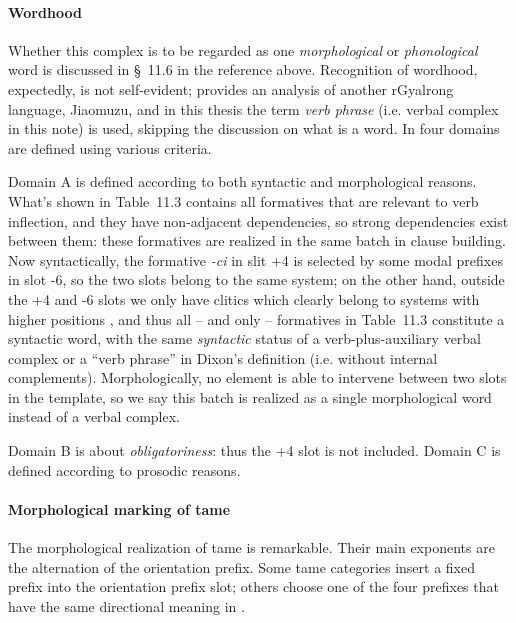 \documentclass[a4paper, oneside, 12pt]{report}
\newcommand*{\citesec}[1]{\S~{#1}}
\newcommand*{\citetable}[1]{Table~{#1}}
\newcommand*{\term}[1]{\emph{#1}}
\newcommand{\form}[1]{\emph{#1}}
\begin{document}
\paragraph*{Wordhood}
Whether this complex is to be regarded as one \emph{morphological} or \emph{phonological} word 
is discussed in \citesec{11.6}
in the reference above.
Recognition of wordhood, expectedly, is not self-evident;
\citet{prins2011web} provides an analysis of another rGyalrong language, Jiaomuzu, 
and in this thesis the term \term{verb phrase} 
(i.e. verbal complex in this note) is used,
skipping the discussion on what is a word.
In \citet[\citetable{11.3}]{jacques2021grammar}
four domains are defined using various criteria.

Domain A is defined according to both syntactic and morphological reasons.
What's shown in 
\citetable{11.3} contains all formatives that are relevant to verb inflection,
and they have non-adjacent dependencies,
so strong dependencies exist between them:
these formatives are realized in the same batch 
in clause building.
Now syntactically, the formative \form{-ci} in slit +4 
is selected by some modal prefixes in slot -6,
so the two slots belong to the same system;
on the other hand, outside the +4 and -6 slots 
we only have clitics which clearly belong to systems with higher positions
\citep[\citesec{11.6.2}]{jacques2021grammar},
and thus all -- and only -- formatives in \citetable{11.3}
constitute a syntactic word,
with the same \emph{syntactic} status of a verb-plus-auxiliary verbal complex or a
``verb phrase'' in Dixon's definition (i.e. without internal complements). 
Morphologically, no element is able to intervene 
between two slots in the template, 
so we say this batch is realized as a single morphological word 
instead of a verbal complex.

Domain B is about \emph{obligatoriness}:
thus the +4 slot is not included.
Domain C is defined according to prosodic reasons.

\paragraph*{Morphological marking of \ac{tame}}
The morphological realization of \ac{tame} is remarkable.
Their main exponents are the alternation of the orientation prefix.
Some \acs{tame} categories insert a fixed prefix 
into the orientation prefix slot;
others choose one of the four prefixes that have the same directional meaning 
in \citet[\citetable{15.1}]{jacques2021grammar}. 
\end{document}
